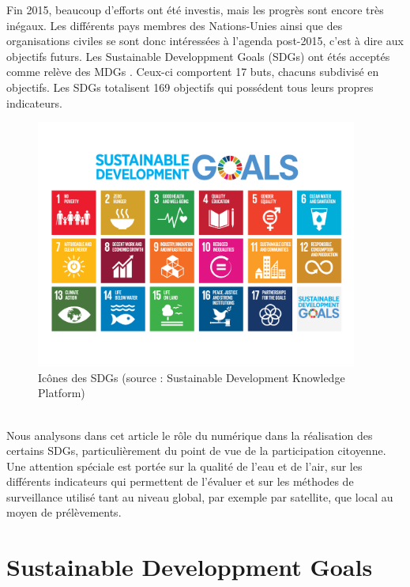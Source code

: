 \documentclass[10pt, conference, compsocconf]{llncs}
\begin{document}
	Fin 2015, beaucoup d'efforts ont été investis, mais les progrès sont encore très inégaux. Les différents pays membres des Nations-Unies ainsi que des organisations civiles se sont donc intéressées à l'agenda post-2015, c'est à dire aux objectifs futurs. Les Sustainable Developpment Goals (SDGs) ont étés acceptés comme relève des MDGs \cite{wikipedia_sustainable_2017}. Ceux-ci comportent 17 buts, chacuns subdivisé en objectifs. Les SDGs totalisent 169 objectifs qui possédent tous leurs propres indicateurs.
	\begin{figure}
		\begin{center}
			\includegraphics[width=300pt]{sdgs.png}
		\end{center}
		\caption{Icônes des SDGs (source : Sustainable Development Knowledge Platform)}
	\end{figure}
	\\
	Nous analysons dans cet article le rôle du numérique dans la réalisation des certains SDGs, particulièrement du point de vue de la participation citoyenne. Une attention spéciale est portée sur la qualité de l'eau et de l'air, sur les différents indicateurs qui permettent de l'évaluer et sur les méthodes de surveillance utilisé tant au niveau global, par exemple par satellite, que local au moyen de prélèvements.

\section{Sustainable Developpment Goals}
\end{document}
